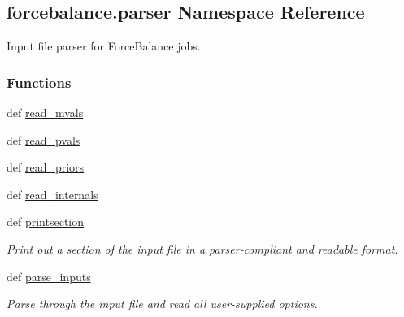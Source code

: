 \hypertarget{namespaceforcebalance_1_1parser}{\subsection{forcebalance.\-parser Namespace Reference}
\label{namespaceforcebalance_1_1parser}
}


Input file parser for Force\-Balance jobs.  


\subsubsection*{Functions}
\begin{DoxyCompactItemize}
\item 
def \hyperlink{namespaceforcebalance_1_1parser_aef8b51dba6bb9767a9a956319eb3cc08}{read\-\_\-mvals}
\item 
def \hyperlink{namespaceforcebalance_1_1parser_a56fb1e139dad24bac29f25a3870765ca}{read\-\_\-pvals}
\item 
def \hyperlink{namespaceforcebalance_1_1parser_a94c3f1acd06b640db3042dc45e32af8e}{read\-\_\-priors}
\item 
def \hyperlink{namespaceforcebalance_1_1parser_a10827b0b21d0463bc9e786f161a02654}{read\-\_\-internals}
\item 
def \hyperlink{namespaceforcebalance_1_1parser_a00a8cb7b534312c13b11d4bb39bb3959}{printsection}
\begin{DoxyCompactList}\small\item\em Print out a section of the input file in a parser-\/compliant and readable format. \end{DoxyCompactList}\item 
def \hyperlink{namespaceforcebalance_1_1parser_ac184c809737a27f35530020322431f7c}{parse\-\_\-inputs}
\begin{DoxyCompactList}\small\item\em Parse through the input file and read all user-\/supplied options. \end{DoxyCompactList}\end{DoxyCompactItemize}
